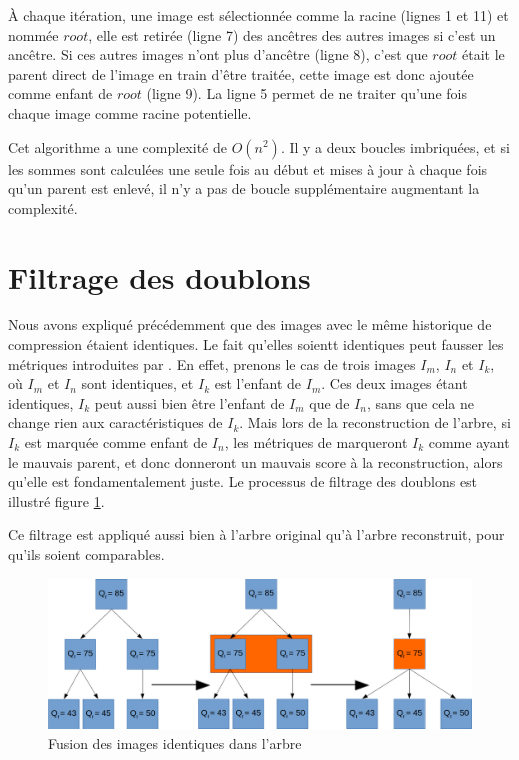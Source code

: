 \documentclass[utf8,final]{stageM2R} %
\begin{document}
À chaque itération, une image est sélectionnée comme la racine (lignes 1 et 11) et nommée $root$, elle est retirée (ligne 7) des ancêtres des autres images si c'est un ancêtre. Si ces autres images n'ont plus d'ancêtre (ligne 8), c'est que $root$ était le parent direct de l'image en train d'être traitée, cette image est donc ajoutée comme enfant de $root$ (ligne 9). La ligne 5 permet de ne traiter qu'une fois chaque image comme racine potentielle.

Cet algorithme a une complexité de $O(n^{2})$. Il y a deux boucles imbriquées, et si les sommes sont calculées une seule fois au début et mises à jour à chaque fois qu'un parent est enlevé, il n'y a pas de boucle supplémentaire augmentant la complexité.

\section{Filtrage des doublons}
Nous avons expliqué précédemment que des images avec le même historique de compression étaient identiques. Le fait qu'elles soientt identiques peut fausser les métriques introduites par . En effet, prenons le cas de trois images $I_m$, $I_n$ et $I_k$, où $I_m$ et $I_n$ sont identiques, et $I_k$ est l'enfant de $I_m$. Ces deux images étant identiques, $I_k$ peut aussi bien être l'enfant de $I_m$ que de $I_n$, sans que cela ne change rien aux caractéristiques de $I_k$. Mais lors de la reconstruction de l'arbre, si $I_k$ est marquée comme enfant de $I_n$, les métriques de  marqueront $I_k$ comme ayant le mauvais parent, et donc donneront un mauvais score à la reconstruction, alors qu'elle est fondamentalement juste. Le processus de filtrage des doublons est illustré figure \ref{fig:identique}. 

Ce filtrage est appliqué aussi bien à l'arbre original qu'à l'arbre reconstruit, pour qu'ils soient comparables.


\begin{figure}
\centering
\includegraphics[width=0.9\linewidth]{images/fusion_1}
\caption{Fusion des images identiques dans l'arbre}
\label{fig:identique}
\end{figure}
\end{document}
